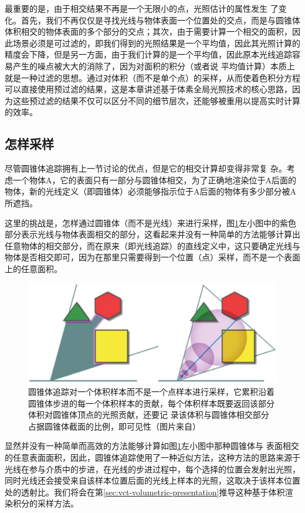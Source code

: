 最重要的是，由于相交结果不再是一个无限小的点，光照估计的属性发生 了变化。首先，我们不再仅仅是寻找光线与物体表面一个位置处的交点，而是与圆锥体体积相交的物体表面的多个部分的交点；其次，由于需要计算一个相交的面积，因此场景必须是可过滤的，即我们得到的光照结果是一个平均值，因此其光照计算的精度会下降，但是另一方面，由于我们计算的是一个平均值，因此原本光线追踪容易产生的噪点被大大的消除了，因为对面积的积分（或者说 平均值计算）本质上就是一种过滤的思想。通过对体积（而不是单个点）的采样，从而使着色积分方程可以直接使用预过滤的结果，这是本章讲述基于体素全局光照技术的核心思路，因为这些预过滤的结果不仅可以区分不同的细节层次，还能够被重用以提高实时计算的效率。



\subsection{怎样采样}
尽管圆锥体追踪拥有上一节讨论的优点，但是它的相交计算却变得非常复 杂。考虑一个物体A，它的表面只有一部分与圆锥体相交，为了正确地渲染位于A后面的物体，新的光线定义（即圆锥体）必须能够指示位于A后面的物体有多少部分被A所遮挡。

这里的挑战是，怎样通过圆锥体（而不是光线）来进行采样，图\ref{f:vct-2-2}左小图中的紫色部分表示光线与物体表面相交的部分，这看起来并没有一种简单的方法能够计算出任意物体的相交部分，而在原来（即光线追踪）的直线定义中，这只要确定光线与物体是否相交即可，因为在那里只需要得到一个位置（点）采样，而不是一个表面上的任意面积。

\begin{figure}
	\includegraphics[width=\textwidth]{figures/vct/vct-2-2}
	\caption{圆锥体追踪对一个体积样本而不是一个点样本进行采样，它累积沿着圆锥体步进的每一个体积样本的贡献，每个体积样本既要返回该部分体积对圆锥体顶点的光照贡献，还要记 录该体积与圆锥体相交部分占据圆锥体截面的比例，即可见性（图片来自\cite{a:TheTechnologyofTheTomorrowChildren}）}
	\label{f:vct-2-2}
\end{figure}

显然并没有一种简单而高效的方法能够计算如图\ref{f:vct-2-2}左小图中那种圆锥体与 表面相交的任意表面面积，因此，圆锥体追踪使用了一种近似方法，这种方法的思路来源于光线在参与介质中的步进，在光线的步进过程中，每个选择的位置会发射出光照，同时光线还会接受来自该样本位置后面的光线上样本的光照，这取决于该样本位置处的透射比。我们将会在第\ref{sec:vct-volumetric-presentation}推导这种基于体积渲染积分的采样方法。

